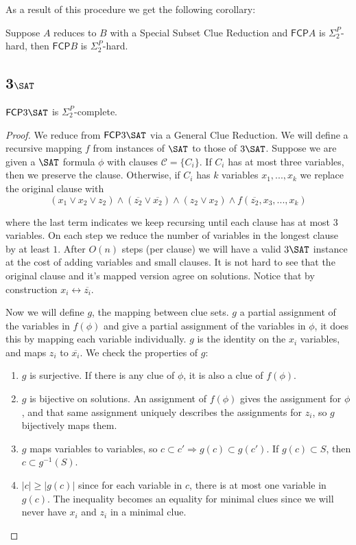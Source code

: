\documentclass[runningheads,a4paper]{llncs}
\begin{document}
As a result of this procedure we get the following corollary: 

\begin{corollary}
\label{thm:special_reduc}
Suppose $A$ reduces to $B$ with a Special Subset Clue Reduction and $\mathsf{FCP} A$ is $\Sigma_2^P$-hard, then $\mathsf{FCP} B$ is $\Sigma_2^P$-hard. 
\end{corollary}

\subsection{3$\SAT$}

\begin{theorem}
$\mathsf{FCP} 3\SAT$ is $\Sigma_2^P$-complete. 
\end{theorem} 

\begin{proof}
We reduce from $\mathsf{FCP} 3\SAT$ via a General Clue Reduction. We will define a recursive mapping $f$ from instances of $\SAT$ to those of $3\SAT$. Suppose we are given a $\SAT$ formula $\phi$ with clauses $\mathcal{C} = \{C_i\}$. If $C_i$ has at most three variables, then we preserve the clause. Otherwise, if $C_i$ has $k$ variables $x_1,...,x_k$ we replace the original clause with 
\[ 
(x_1 \vee x_2 \vee z_2) \wedge (\overline{z_2} \vee \overline{x_2}) \wedge (z_2 \vee x_2) \wedge f(\overline{z_2}, x_3, ..., x_k) 
\]

where the last term indicates we keep recursing until each clause has at most $3$ variables. On each step we reduce the number of variables in the longest clause by at least $1$. After $O(n)$ steps (per clause) we will have a valid $3\SAT$ instance at the cost of adding variables and small clauses. It is not hard to see that the original clause and it's mapped version agree on solutions. Notice that by construction $x_i \leftrightarrow \overline{z_i}$. 

Now we will define $g$, the mapping between clue sets. $g$ a partial assignment of the variables in $f(\phi)$ and give a partial assignment of the variables in $\phi$, it does this by mapping each variable individually. $g$ is the identity on the $x_i$ variables, and maps $z_i$ to $\overline{x_i}$. We check the properties of $g$:
\begin{enumerate}
\item $g$ is surjective. If there is any clue of $\phi$, it is also a clue of $f(\phi)$. 	
\item $g$ is bijective on solutions. An assignment of $f(\phi)$ gives the assignment for $\phi$, and that same assignment uniquely describes the assignments for $z_i$, so $g$ bijectively maps them.
\item $g$ maps variables to variables, so $c \subset c' \Rightarrow g(c) \subset g(c')$. If $g(c) \subset S$, then $c \subset g^{-1}(S)$. 
\item $|c| \geq |g(c)|$ since for each variable in $c$, there is at most one variable in $g(c)$. The inequality becomes an equality for minimal clues since we will never have $x_i$ and $z_i$ in a minimal clue.
\end{enumerate}
\end{proof}
\end{document}
